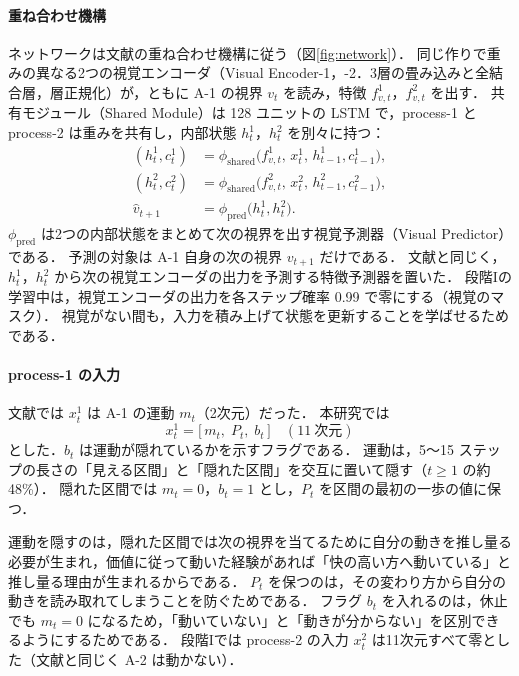 \paragraph{重ね合わせ機構}
ネットワークは文献\cite{noguchi2022superposition}の重ね合わせ機構に従う（図\ref{fig:network}）．
同じ作りで重みの異なる2つの視覚エンコーダ（Visual Encoder-1，-2．3層の畳み込みと全結合層，層正規化）が，ともに A-1 の視界 $v_t$ を読み，特徴 $f^1_{v,t}$，$f^2_{v,t}$ を出す．
共有モジュール（Shared Module）は 128 ユニットの LSTM で，process-1 と process-2 は重みを共有し，内部状態 $h^1_t$，$h^2_t$ を別々に持つ：
\begin{align}
  (h^1_t, c^1_t) &= \phi_{\mathrm{shared}}\bigl(f^1_{v,t},\, x^1_t,\, h^1_{t-1}, c^1_{t-1}\bigr), \\
  (h^2_t, c^2_t) &= \phi_{\mathrm{shared}}\bigl(f^2_{v,t},\, x^2_t,\, h^2_{t-1}, c^2_{t-1}\bigr), \\
  \hat v_{t+1} &= \phi_{\mathrm{pred}}\bigl(h^1_t, h^2_t\bigr).
\end{align}
$\phi_{\mathrm{pred}}$ は2つの内部状態をまとめて次の視界を出す視覚予測器（Visual Predictor）である．
予測の対象は A-1 自身の次の視界 $v_{t+1}$ だけである．
文献\cite{noguchi2022superposition}と同じく，$h^1_t$，$h^2_t$ から次の視覚エンコーダの出力を予測する特徴予測器を置いた．
段階Iの学習中は，視覚エンコーダの出力を各ステップ確率 0.99 で零にする（視覚のマスク）．
視覚がない間も，入力を積み上げて状態を更新することを学ばせるためである．

\paragraph{process-1 の入力}
文献\cite{noguchi2022superposition}では $x^1_t$ は A-1 の運動 $m_t$（2次元）だった．
本研究では
\begin{equation}
  x^1_t = \bigl[\, m_t,\; P_t,\; b_t \,\bigr] \quad (11\ \text{次元})
\end{equation}
とした．$b_t$ は運動が隠れているかを示すフラグである．
運動は，5〜15 ステップの長さの「見える区間」と「隠れた区間」を交互に置いて隠す（$t\ge1$ の約48\%）．
隠れた区間では $m_t=0$，$b_t=1$ とし，$P_t$ を区間の最初の一歩の値に保つ．

運動を隠すのは，隠れた区間では次の視界を当てるために自分の動きを推し量る必要が生まれ，価値に従って動いた経験があれば「快の高い方へ動いている」と推し量る理由が生まれるからである．
$P_t$ を保つのは，その変わり方から自分の動きを読み取れてしまうことを防ぐためである．
フラグ $b_t$ を入れるのは，休止でも $m_t=0$ になるため，「動いていない」と「動きが分からない」を区別できるようにするためである．
段階Iでは process-2 の入力 $x^2_t$ は11次元すべて零とした（文献\cite{noguchi2022superposition}と同じく A-2 は動かない）．

